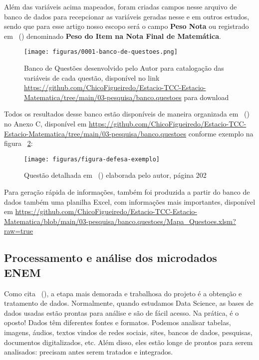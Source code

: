 \documentclass[
	article,			%
	11pt,				%
	oneside,			%
	a4paper,			%
	english,			%
	brazil,				%
	sumario=tradicional
]{abntex2}
\newcommand{\citeaa}[1]{\citeauthoronline{#1}~(\citeyear{#1})}
\begin{document}
			Além das variáveis acima mapeados, foram criadas campos nesse arquivo de banco de dados para recepcionar as variáveis geradas nesse e em outros estudos, sendo que para esse artigo nosso escopo será o campo \textbf{Peso Nota} ou registrado em \citeaa{Figueiredo2021Tese} denominado \textbf{Peso do Item na Nota Final de Matemática}.
		
			\begin{figure}[H]
				\centering
				\texttt{[image: figuras/0001-banco-de-questoes.png]}
				\caption[Banco de Questões]{Banco de Questões desenvolvido pelo Autor para catalogação das variáveis de cada questão, disponível no link \url{https://github.com/ChicoFigueiredo/Estacio-TCC-Estacio-Matematica/tree/main/03-pesquisa/banco.questoes} para download}
				\label{fig:0001-banco-de-questoes}
			\end{figure}
		
			Todos os resultados desse banco estão disponíveis de maneira organizada em \citeaa{Figueiredo2021Tese} no Anexo C, disponível em \url{https://github.com/ChicoFigueiredo/Estacio-TCC-Estacio-Matematica/tree/main/03-pesquisa/banco.questoes} conforme exemplo na figura ~\ref{fig:figura-defesa-exemplo}:
			
			\begin{figure}[H]
				\centering
				\texttt{[image: figuras/figura-defesa-exemplo]}
				\caption[Exemplo de Questão]{Questão detalhada em \citeaa{Figueiredo2021Tese} elaborada pelo autor, página 202}
				\label{fig:figura-defesa-exemplo}
			\end{figure}
						
			Para geração rápida de informações, também foi produzida a partir do banco de dados também uma planilha Excel, com informações mais importantes, disponível em \url{https://github.com/ChicoFigueiredo/Estacio-TCC-Estacio-Matematica/blob/main/03-pesquisa/banco.questoes/Mapa_Questoes.xlsm?raw=true}
			
	
		\subsection{Processamento e análise dos microdados ENEM}
			Como cita \citeaa{Morita2021}, a etapa mais demorada e trabalhosa do projeto é a obtenção e tratamento de dados. Normalmente, quando estudamos Data Science, as bases de dados usadas estão prontas para análise e são de fácil acesso. Na prática, é o oposto! Dados têm diferentes fontes e formatos. Podemos analisar tabelas, imagens, áudios, textos vindos de redes sociais, sites, bancos de dados, pesquisas, documentos digitalizados, etc. Além disso, eles estão longe de prontos para serem analisados: precisam antes serem tratados e integrados.
			
\end{document}
